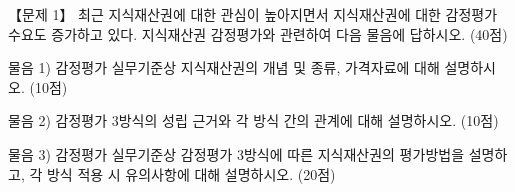 \begin{longquestion}{【문제 1】}
최근 지식재산권에 대한 관심이 높아지면서 지식재산권에 대한 감정평가 수요도 증가하고 있다. 지식재산권 감정평가와 관련하여 다음 물음에 답하시오. (40점) \par
\medskip\noindent 물음 1) 감정평가 실무기준상 지식재산권의 개념 및 종류, 가격자료에 대해 설명하시오. (10점) \par
\medskip\noindent 물음 2) 감정평가 3방식의 성립 근거와 각 방식 간의 관계에 대해 설명하시오. (10점) \par
\medskip\noindent 물음 3) 감정평가 실무기준상 감정평가 3방식에 따른 지식재산권의 평가방법을 설명하고, 각 방식 적용 시 유의사항에 대해 설명하시오. (20점) \par
\end{longquestion}
